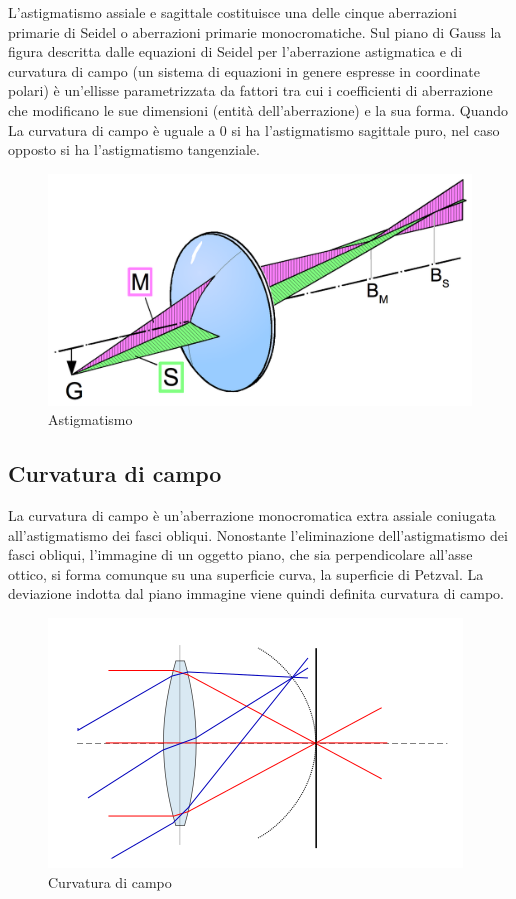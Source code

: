 L'astigmatismo assiale e sagittale costituisce una delle cinque aberrazioni
primarie di Seidel o aberrazioni primarie monocromatiche. Sul piano di Gauss
la figura descritta dalle equazioni di Seidel per l'aberrazione astigmatica e
di curvatura di campo (un sistema di equazioni in genere espresse in
coordinate polari) è un’ellisse parametrizzata da fattori tra cui i
coefficienti di aberrazione che modificano le sue dimensioni (entità
dell'aberrazione) e la sua forma. Quando La curvatura di campo è uguale a 0 si
ha l’astigmatismo sagittale puro, nel caso opposto si ha l’astigmatismo
tangenziale.

\begin{figure}

\centering
\includegraphics[width=.5\textwidth]{img/astigmatismo.png}

\caption{Astigmatismo}
\label{fig:astigmatismo}
\end{figure}

\subsection{Curvatura di campo}
La curvatura di campo è un'aberrazione
monocromatica extra assiale coniugata all'astigmatismo dei fasci obliqui.
Nonostante l'eliminazione dell'astigmatismo dei fasci obliqui, l'immagine di
un oggetto piano, che sia perpendicolare all'asse ottico, si forma comunque su
una superficie curva, la superficie di Petzval. La deviazione indotta dal
piano immagine viene quindi definita curvatura di campo.

\begin{figure}

\centering
\includegraphics[width=.5\textwidth]{img/curvatura-campo.png}

\caption{Curvatura di campo}
\label{fig:curvatura-campo}
\end{figure}

